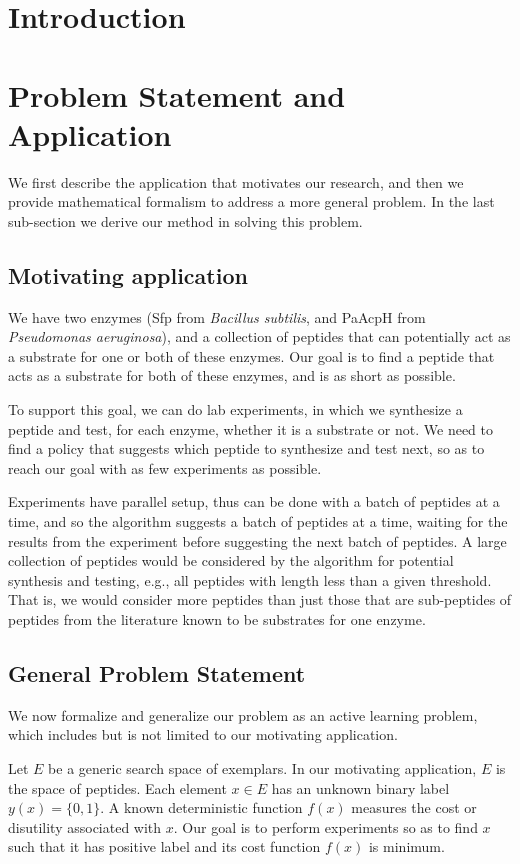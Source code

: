 \documentclass[11pt]{article}
\begin{document}
\section{Introduction}

\section{Problem Statement and Application}
We first describe the application that motivates our research, and then we provide mathematical formalism to address a more general problem. In the last sub-section we derive our method in solving this problem.

\subsection{Motivating application}
We have two enzymes (Sfp from {\it Bacillus subtilis}, and PaAcpH from {\it Pseudomonas aeruginosa}), and a collection of peptides that can potentially act as a substrate for one or both of these enzymes.  Our goal is to find a peptide that acts as a substrate for both of these enzymes, and is as short as possible.

To support this goal, we can do lab experiments, in which we synthesize a peptide and test, for each enzyme, whether it is a substrate or not.  We need to find a policy that suggests which peptide to synthesize and test next, so as to reach our goal with as few experiments as possible.

Experiments have parallel setup, thus can be done with a batch of peptides at a time, and so the algorithm suggests a batch of peptides at a time, waiting for the results from the experiment before suggesting the next batch of peptides.
A large collection of peptides would be considered by the algorithm for potential synthesis and testing, e.g., all peptides with length less than a given threshold.  That is, we would consider more peptides than just those that are sub-peptides of peptides from the literature known to be substrates for one enzyme.

\subsection{General Problem Statement}
We now formalize and generalize our problem as an active learning problem, which includes but is not limited to our motivating application.

Let $E$ be a generic search space of exemplars.  In our motivating application, $E$ is the space of peptides.
Each element $x \in E$ has an unknown binary label $y(x)=\{0,1\}$.  A known deterministic function $f(x)$ measures the cost or disutility associated with $x$. Our goal is to perform experiments so as to find $x$ such that it has positive label and its cost function $f(x)$ is minimum.
\end{document}
